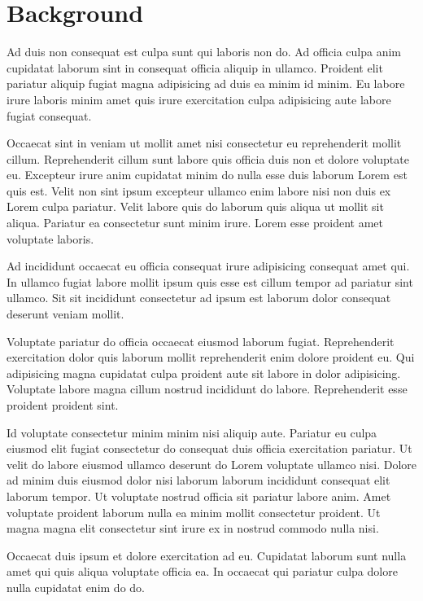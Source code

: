 \section{Background}
Ad duis non consequat est culpa sunt qui laboris non do. Ad officia culpa anim cupidatat laborum sint in consequat officia aliquip in ullamco. Proident elit pariatur aliquip fugiat magna adipisicing ad duis ea minim id minim. Eu labore irure laboris minim amet quis irure exercitation culpa adipisicing aute labore fugiat consequat.

Occaecat sint in veniam ut mollit amet nisi consectetur eu reprehenderit mollit cillum. Reprehenderit cillum sunt labore quis officia duis non et dolore voluptate eu. Excepteur irure anim cupidatat minim do nulla esse duis laborum Lorem est quis est. Velit non sint ipsum excepteur ullamco enim labore nisi non duis ex Lorem culpa pariatur. Velit labore quis do laborum quis aliqua ut mollit sit aliqua. Pariatur ea consectetur sunt minim irure. Lorem esse proident amet voluptate laboris.

Ad incididunt occaecat eu officia consequat irure adipisicing consequat amet qui. In ullamco fugiat labore mollit ipsum quis esse est cillum tempor ad pariatur sint ullamco. Sit sit incididunt consectetur ad ipsum est laborum dolor consequat deserunt veniam mollit.

Voluptate pariatur do officia occaecat eiusmod laborum fugiat. Reprehenderit exercitation dolor quis laborum mollit reprehenderit enim dolore proident eu. Qui adipisicing magna cupidatat culpa proident aute sit labore in dolor adipisicing. Voluptate labore magna cillum nostrud incididunt do labore. Reprehenderit esse proident proident sint.

Id voluptate consectetur minim minim nisi aliquip aute. Pariatur eu culpa eiusmod elit fugiat consectetur do consequat duis officia exercitation pariatur. Ut velit do labore eiusmod ullamco deserunt do Lorem voluptate ullamco nisi. Dolore ad minim duis eiusmod dolor nisi laborum laborum incididunt consequat elit laborum tempor. Ut voluptate nostrud officia sit pariatur labore anim. Amet voluptate proident laborum nulla ea minim mollit consectetur proident. Ut magna magna elit consectetur sint irure ex in nostrud commodo nulla nisi.

Occaecat duis ipsum et dolore exercitation ad eu. Cupidatat laborum sunt nulla amet qui quis aliqua voluptate officia ea. In occaecat qui pariatur culpa dolore nulla cupidatat enim do do.

